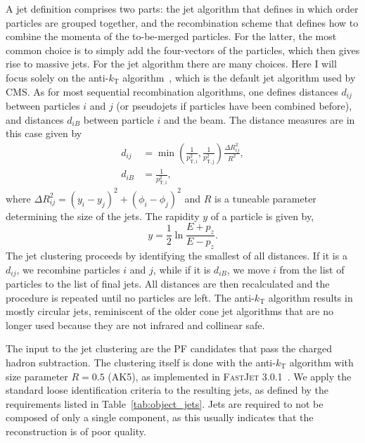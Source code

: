 A jet definition comprises two parts: the jet algorithm that defines in which order particles are
grouped together, and the recombination scheme that defines how to combine the momenta of the
to-be-merged particles. 
For the latter, the most common choice is to simply add the four-vectors of the particles, which
then gives rise to massive jets. 
For the jet algorithm there are many choices. Here I will focus solely on the anti-$k_\textrm{T}$
algorithm~\cite{antikt}, which is the default jet algorithm used by CMS.
As for most sequential recombination algorithms, one defines distances $d_{ij}$ between particles
$i$ and $j$ (or pseudojets if particles have been combined before),  and distances $d_{iB}$ between
particle $i$ and the beam.
The distance measures are in this case given by
\begin{align}
  d_{ij} &= \min \left(\frac{1}{p_{\mathrm{T,i}}^2}, \frac{1}{p_{\mathrm{T,j}}^2}\right)
\frac{\Delta R_{ij}^2}{R^2}, \\
  d_{iB} &= \frac{1}{p_{\mathrm{T,i}}^2},
\end{align}
where $\Delta R_{ij}^2 = (y_i - y_j)^2 + (\phi_i - \phi_j)^2$ and $R$ is a tuneable parameter
determining the size of the jets. The rapidity $y$ of a particle is given by,
\begin{equation}
  y = \frac{1}{2} \ln{\frac{ E + p_z }{ E - p_z }} . \label{eq:rapidity}
\end{equation}
The jet clustering proceeds by identifying the smallest of all distances. If it is a $d_{ij}$, we
recombine particles $i$ and $j$, while if it is $d_{iB}$, we move $i$ from the list of particles to
the list of final jets. All distances are then recalculated and the procedure is repeated until no
particles are left.
The anti-$k_\textrm{T}$ algorithm results in mostly circular jets, reminiscent of the older cone jet
algorithms that are no longer used because they are not infrared and collinear safe.

The input to the jet clustering are the PF candidates that pass the charged hadron subtraction. 
The clustering itself is done with the anti-$k_\textrm{T}$ algorithm with size parameter $R=0.5$
(AK5), as implemented in \textsc{FastJet 3.0.1}~\cite{Cacciari:2011ma}.
We apply the standard loose identification criteria to the resulting jets, as defined by the
requirements listed in Table~\ref{tab:object_jets}. Jets are required to not be composed of only a
single component, as this usually indicates that the reconstruction is of poor quality. 

